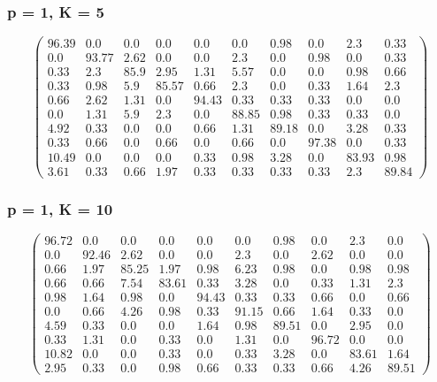 \begin{appendices}
\subsubsection*{p = 1, K = 5}

$$\begin{pmatrix}
96.39&0.0&0.0&0.0&0.0&0.0&0.98&0.0&2.3&0.33\\
0.0&93.77&2.62&0.0&0.0&2.3&0.0&0.98&0.0&0.33\\
0.33&2.3&85.9&2.95&1.31&5.57&0.0&0.0&0.98&0.66\\
0.33&0.98&5.9&85.57&0.66&2.3&0.0&0.33&1.64&2.3\\
0.66&2.62&1.31&0.0&94.43&0.33&0.33&0.33&0.0&0.0\\
0.0&1.31&5.9&2.3&0.0&88.85&0.98&0.33&0.33&0.0\\
4.92&0.33&0.0&0.0&0.66&1.31&89.18&0.0&3.28&0.33\\
0.33&0.66&0.0&0.66&0.0&0.66&0.0&97.38&0.0&0.33\\
10.49&0.0&0.0&0.0&0.33&0.98&3.28&0.0&83.93&0.98\\
3.61&0.33&0.66&1.97&0.33&0.33&0.33&0.33&2.3&89.84
\end{pmatrix}$$

\subsubsection*{p = 1, K = 10}
$$\begin{pmatrix}
96.72&0.0&0.0&0.0&0.0&0.0&0.98&0.0&2.3&0.0\\
0.0&92.46&2.62&0.0&0.0&2.3&0.0&2.62&0.0&0.0\\
0.66&1.97&85.25&1.97&0.98&6.23&0.98&0.0&0.98&0.98\\
0.66&0.66&7.54&83.61&0.33&3.28&0.0&0.33&1.31&2.3\\
0.98&1.64&0.98&0.0&94.43&0.33&0.33&0.66&0.0&0.66\\
0.0&0.66&4.26&0.98&0.33&91.15&0.66&1.64&0.33&0.0\\
4.59&0.33&0.0&0.0&1.64&0.98&89.51&0.0&2.95&0.0\\
0.33&1.31&0.0&0.33&0.0&1.31&0.0&96.72&0.0&0.0\\
10.82&0.0&0.0&0.33&0.0&0.33&3.28&0.0&83.61&1.64\\
2.95&0.33&0.0&0.98&0.66&0.33&0.33&0.66&4.26&89.51
\end{pmatrix}$$


\end{appendices}
